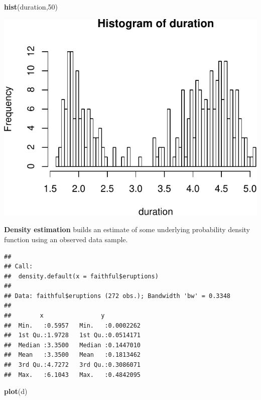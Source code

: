 \documentclass[]{article}
\newenvironment{Shaded}{\begin{snugshade}}{\end{snugshade}}
\newcommand{\KeywordTok}[1]{\textcolor[rgb]{0.13,0.29,0.53}{\textbf{{#1}}}}
\newcommand{\DecValTok}[1]{\textcolor[rgb]{0.00,0.00,0.81}{{#1}}}
\newcommand{\StringTok}[1]{\textcolor[rgb]{0.31,0.60,0.02}{{#1}}}
\newcommand{\NormalTok}[1]{{#1}}
\numberwithin{equation}{section}
\begin{document}
\begin{Shaded}
\begin{Highlighting}[]
\KeywordTok{hist}\NormalTok{(duration,}\DecValTok{50}\NormalTok{)}
\end{Highlighting}
\end{Shaded}

\includegraphics{index_files/figure-latex/unnamed-chunk-107-2.pdf}

\textbf{Density estimation} builds an estimate of some underlying
probability density function using an observed data sample.

\begin{Shaded}
\end{Shaded}

\begin{verbatim}
## 
## Call:
##  density.default(x = faithful$eruptions)
## 
## Data: faithful$eruptions (272 obs.); Bandwidth 'bw' = 0.3348
## 
##        x                y            
##  Min.   :0.5957   Min.   :0.0002262  
##  1st Qu.:1.9728   1st Qu.:0.0514171  
##  Median :3.3500   Median :0.1447010  
##  Mean   :3.3500   Mean   :0.1813462  
##  3rd Qu.:4.7272   3rd Qu.:0.3086071  
##  Max.   :6.1043   Max.   :0.4842095
\end{verbatim}

\begin{Shaded}
\begin{Highlighting}[]
\KeywordTok{plot}\NormalTok{(d)}
\end{Highlighting}
\end{Shaded}
\end{document}
